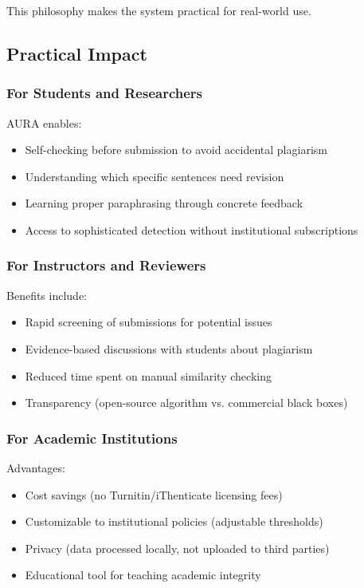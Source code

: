 \documentclass[conference]{IEEEtran}
\begin{document}
This philosophy makes the system practical for real-world use.

\subsection{Practical Impact}

\subsubsection{For Students and Researchers}
AURA enables:
\begin{itemize}
    \item Self-checking before submission to avoid accidental plagiarism
    \item Understanding which specific sentences need revision
    \item Learning proper paraphrasing through concrete feedback
    \item Access to sophisticated detection without institutional subscriptions
\end{itemize}

\subsubsection{For Instructors and Reviewers}
Benefits include:
\begin{itemize}
    \item Rapid screening of submissions for potential issues
    \item Evidence-based discussions with students about plagiarism
    \item Reduced time spent on manual similarity checking
    \item Transparency (open-source algorithm vs. commercial black boxes)
\end{itemize}

\subsubsection{For Academic Institutions}
Advantages:
\begin{itemize}
    \item Cost savings (no Turnitin/iThenticate licensing fees)
    \item Customizable to institutional policies (adjustable thresholds)
    \item Privacy (data processed locally, not uploaded to third parties)
    \item Educational tool for teaching academic integrity
\end{itemize}
\end{document}
